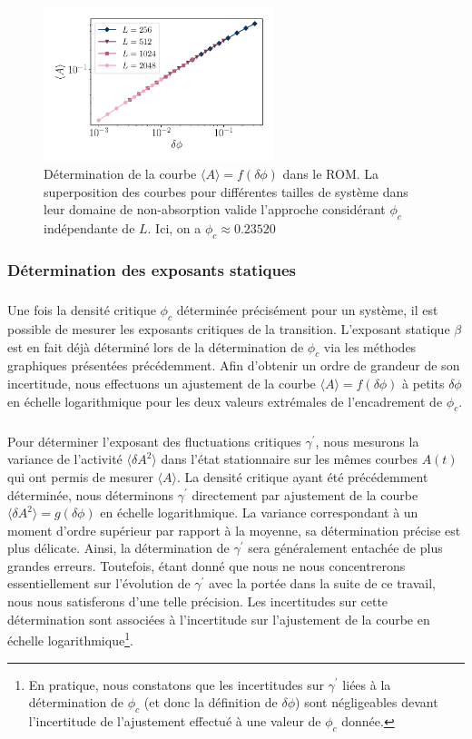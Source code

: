 \begin{figure}[h]
	\centering
	\includegraphics[width=0.6\textwidth]{Chapitre2/Figures/Phi_cindep.pdf}
	\caption{Détermination de la courbe $\langle A \rangle = f(\delta\phi)$ dans le ROM. La superposition des courbes pour différentes tailles de système dans leur domaine de non-absorption valide l'approche considérant $\phi_c$ indépendante de $L$. Ici, on a $\phi_c \approx 0.23520$}
	\label{fig:Effet_Taille_Phic}
\end{figure}

\subsubsection{Détermination des exposants statiques}

\subparagraph{}Une fois la densité critique $\phi_c$ déterminée précisément pour un système, il est possible de mesurer les exposants critiques de la transition. L'exposant statique $\beta$ est en fait déjà déterminé lors de la détermination de $\phi_c$ via les méthodes graphiques présentées précédemment. Afin d'obtenir un ordre de grandeur de son incertitude, nous effectuons un ajustement de la courbe $\langle A \rangle = f(\delta\phi)$ à petits $\delta\phi$ en échelle logarithmique pour les deux valeurs extrémales de l'encadrement de $\phi_c$.

\subparagraph{}Pour déterminer l'exposant des fluctuations critiques $\gamma^\prime$, nous mesurons la variance de l'activité $\langle \delta A^2\rangle$ dans l'état stationnaire sur les mêmes courbes $A(t)$ qui ont permis de mesurer $\langle A \rangle$. La densité critique ayant été précédemment déterminée, nous déterminons $\gamma^\prime$ directement par ajustement de la courbe $\langle \delta A^2\rangle = g(\delta\phi)$ en échelle logarithmique. La variance correspondant à un moment d'ordre supérieur par rapport à la moyenne, sa détermination précise est plus délicate. Ainsi, la détermination de $\gamma^\prime$ sera généralement entachée de plus grandes erreurs. Toutefois, étant donné que nous ne nous concentrerons essentiellement sur l'évolution de $\gamma^\prime$ avec la portée dans la suite de ce travail, nous nous satisferons d'une telle précision. Les incertitudes sur cette détermination sont associées à l'incertitude sur l'ajustement de la courbe en échelle logarithmique\footnote{En pratique, nous constatons que les incertitudes sur $\gamma^\prime$ liées à la détermination de $\phi_c$ (et donc la définition de $\delta\phi$) sont négligeables devant l'incertitude de l'ajustement effectué à une valeur de $\phi_c$ donnée.}.

